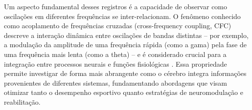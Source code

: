 Um aspecto fundamental desses registros é a capacidade de observar como oscilações em diferentes frequências se inter-relacionam. O fenômeno conhecido como acoplamento de frequências cruzadas (cross-frequency coupling, CFC) descreve a interação dinâmica entre oscilações de bandas distintas – por exemplo, a modulação da amplitude de uma frequência rápida (como a gama) pela fase de uma frequência mais lenta (como a theta) – e é considerado crucial para a integração entre processos neurais e funções fisiológicas \cite{criscuolo2022cognition, cohen2017where}. Essa propriedade permite investigar de forma mais abrangente como o cérebro integra informações provenientes de diferentes sistemas, fundamentando abordagens que visam otimizar tanto o desempenho esportivo quanto estratégias de neuromodulação e reabilitação.